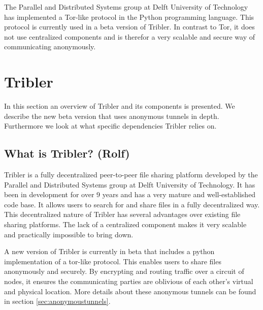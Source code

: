 \documentclass[11pt]{article}
\begin{document}
	The Parallel and Distributed Systems group at Delft University of Technology has implemented a Tor-like protocol in the Python programming language. This protocol is currently used in a beta version of Tribler. In contrast to Tor, it does not use centralized components and is therefor a very scalable and secure way of communicating anonymously.

\section{Tribler}
In this section an overview of Tribler and its components is presented. We describe the new beta version that uses anonymous tunnels in depth. Furthermore we look at what specific dependencies Tribler relies on.

\subsection{What is Tribler? (Rolf)}
Tribler is a fully decentralized peer-to-peer file sharing platform developed by the Parallel and Distributed Systems group at Delft University of Technology. It has been in development for over 9 years and has a very mature and well-established code base. It allows users to search for and share files in a fully decentralized way. This decentralized nature of Tribler has several advantages over existing file sharing platforms. The lack of a centralized component makes it very scalable and practically impossible to bring down.

A new version of Tribler is currently in beta that includes a python implementation of a tor-like protocol. This enables users to share files anonymously and securely. By encrypting and routing traffic over a circuit of nodes, it ensures the communicating parties are oblivious of each other's virtual and physical location. More details about these anonymous tunnels can be found in section \ref{sec:anonymoustunnels}.
\end{document}

